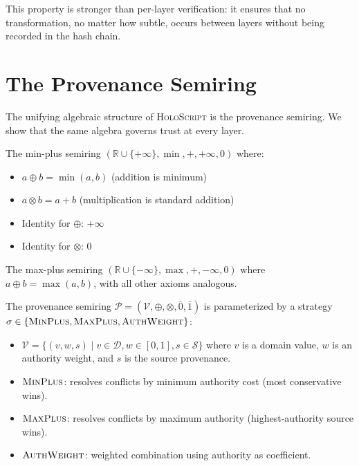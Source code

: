 \documentclass[sigchi-a]{acmart}
\newcommand{\holoscript}{\textsc{HoloScript}}
\newcommand{\tropplus}{\oplus}
\newcommand{\tropmult}{\otimes}
\begin{document}
This property is stronger than per-layer verification: it ensures that no
transformation, no matter how subtle, occurs between layers without being
recorded in the hash chain.


\section{The Provenance Semiring}
\label{sec:semiring}

The unifying algebraic structure of \holoscript{} is the provenance semiring.
We show that the same algebra governs trust at every layer.

\begin{definition}
\label{def:minplus}
The min-plus semiring $(\mathbb{R} \cup \{+\infty\}, \min, +, +\infty, 0)$
where:
\begin{itemize}
  \item $a \tropplus b = \min(a, b)$ (addition is minimum)
  \item $a \tropmult b = a + b$ (multiplication is standard addition)
  \item Identity for $\tropplus$: $+\infty$
  \item Identity for $\tropmult$: $0$
\end{itemize}
\end{definition}

\begin{definition}
\label{def:maxplus}
The max-plus semiring $(\mathbb{R} \cup \{-\infty\}, \max, +, -\infty, 0)$
where $a \tropplus b = \max(a, b)$, with all other axioms analogous.
\end{definition}

\begin{definition}
\label{def:provenance}
The provenance semiring $\mathcal{P} = (\mathcal{V}, \tropplus, \tropmult,
\bar{0}, \bar{1})$ is parameterized by a strategy $\sigma \in
\{\textsc{MinPlus}, \textsc{MaxPlus}, \textsc{AuthWeight}\}$:
\begin{itemize}
  \item $\mathcal{V} = \{(v, w, s) \mid v \in \mathcal{D}, w \in [0,1],
    s \in \mathcal{S}\}$ where $v$ is a domain value, $w$ is an authority
    weight, and $s$ is the source provenance.
  \item $\textsc{MinPlus}$: resolves conflicts by minimum authority cost
    (most conservative wins).
  \item $\textsc{MaxPlus}$: resolves conflicts by maximum authority
    (highest-authority source wins).
  \item $\textsc{AuthWeight}$: weighted combination using authority as
    coefficient.
\end{itemize}
\end{definition}
\end{document}
